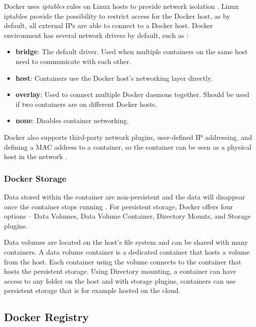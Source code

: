 \documentclass[fleqn,12pt]{olplainarticle}
\begin{document}
Docker uses \textit{iptables} rules on Linux hosts to provide network isolation \citep{docker:iptables}. Linux iptables provide the possibility to restrict access for the Docker host, as by default, all external IPs are able to connect to a Docker host. Docker environment has several network drivers by default, such as \citep{docker:network}:

\begin{itemize}
    \item \textbf{bridge}: The default driver. Used when multiple containers on the same host need to communicate with each other.
    \item \textbf{host}: Containers use the Docker host's networking layer directly.
    \item \textbf{overlay}: Used to connect multiple Docker daemons together. Should be used if two containers are on different Docker hosts.
    \item \textbf{none}: Disables container networking.  
\end{itemize}

Docker also supports third-party network plugins, user-defined IP addressing, and defining a MAC address to a container, so the container can be seen as a physical host in the network \citep{docker:network}.

\subsubsection{Docker Storage}

Data stored within the container are non-persistent and the data will disappear once the container stops running \citep{aquasec:docker_architecture}. For persistent storage, Docker offers four options – Data Volumes, Data Volume Container, Directory Mounts, and Storage plugins. 

Data volumes are located on the host's file system and can be shared with many containers. A data volume container is a dedicated container that hosts a volume from the host. Each container using the volume connects to the container that hosts the persistent storage. Using Directory mounting, a container can have access to any folder on the host and with storage plugins, containers can use persistent storage that is for example hosted on the cloud.

\subsection{Docker Registry}
\end{document}
